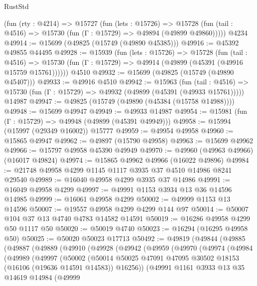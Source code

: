 \begin{lexlean}{RustStd}
\begin{coremodule}
    (fun (rty : @4214) =>
    @15727
      (fun (lets : @15726) =>
      @15728 (fun (tail : @4516) => @15730 (fun (Γ : @15729) => @49894 (@49899 @49860)))))
    @4234
@49914 := @15699 (@49825 (@15749 (@49890 @45385)))
@49916 := @45392 @49855 @44495
@49928 := @15939
    (fun (lets : @15726) =>
    @15728
      (fun (tail : @4516) =>
      @15730 (fun (Γ : @15729) => @49914 (@49899 (@45391 (@49916 @15759 @15761))))))
    @4510
@49932 := @15699 (@49825 (@15749 (@49890 @45407)))
@49933 := @49916 @4510
@49942 := @15963
    (fun (tail : @4516) => @15730 (fun (Γ : @15729) => @49932 (@49899 (@45391 (@49933 @15761)))))
    @14987
@49947 := @49825 (@15749 (@49890 (@45384 (@15758 @14988))))
@49948 := @15699 @49947
@49949 := @49933 @14987
@49954 := @15981 (fun (Γ : @15729) => @49948 (@49899 (@45391 @49949)))
@49958 := @15994 (@15997 (@29349 @16002)) @15777
@49959 := @49954 @49958
@49960 := @15865 @49947
@49962 := @49897 (@15790 @49958)
@49963 := @15699 @49962
@49966 := @15797 @49958 @45390 @49949
@49970 := @49960 (@49963 @49966) (@16017 @49824)
@49974 := @15865 @49962 @49966 (@16022 @49896)
@49984 := @21748 @49958 @4299 @1145 @1117 @3935 @37 @4510 @14986 @8241 @29540
@49989 := @16040 @49958 @4299 @3935 @37 @14986
@49991 := @16049 @49958 @4299
@49997 := @49991 @1153 @3934 @13 @36 @14596 @14985
@49999 := @16061 @49958 @4299
@50002 := @49999 @1153 @13 @14596
@50007 := @19557 @49958 @4299 @4299 @144 @97
@50014 := @50007 @104 @37 @13 @4740 @4783 @14582 @14591
@50019 := @16286 @49958 @4299 @50 @1117 @50
@50020 := @50019 @4740
@50023 := @16294 (@16295 @49958 @50)
@50025 := @50020 @50023 @17713
@50492 := @49819
    (@49844
      (@49885
        (@49887
          (@49889
            (@49910
              (@49928
                (@49942
                  (@49959
                    (@49970
                      (@49974
                        (@49984
                          (@49989
                            (@49997
                              (@50002
                                (@50014
                                  @50025
                                  @47091
                                  @47095
                                  @30502
                                  @18153
                                  (@16106 (@19636 @14591 @14583))
                                  @16256))
                              (@49991
                                @1161
                                @3933
                                @13
                                @35
                                @14619
                                @14984
                                (@49999

\end{coremodule}
\end{lexlean}
